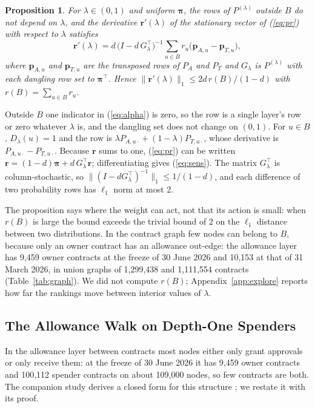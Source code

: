 \documentclass{ieeeaccess}
\newtheorem{proposition}{Proposition}
\begin{document}
\begin{proposition}
\label{prop:localize}
For $\lambda\in(0,1)$ and uniform $\boldsymbol\pi$, the rows of $P^{(\lambda)}$ outside $B$ do not depend on $\lambda$, and the derivative $\mathbf r'(\lambda)$ of the stationary vector of (\ref{eq:pr}) with respect to $\lambda$ satisfies
\begin{equation}
\mathbf r'(\lambda)=d\,\bigl(I-d\,G_\lambda^{\top}\bigr)^{-1}\sum_{u\in B} r_u\bigl(\mathbf p_{A,u}-\mathbf p_{T,u}\bigr),
\label{eq:sens}
\end{equation}
where $\mathbf p_{A,u}$ and $\mathbf p_{T,u}$ are the transposed rows of $P_A$ and $P_T$ and $G_\lambda$ is $P^{(\lambda)}$ with each dangling row set to $\boldsymbol\pi^{\top}$. Hence $\|\mathbf r'(\lambda)\|_1\le 2d\,r(B)/(1-d)$ with $r(B)=\sum_{u\in B}r_u$.
\end{proposition}

\begin{IEEEproof}
Outside $B$ one indicator in (\ref{eq:alpha}) is zero, so the row is a single layer's row or zero whatever $\lambda$ is, and the dangling set does not change on $(0,1)$. For $u\in B$, $D_\lambda(u)=1$ and the row is $\lambda P_{A,u\cdot}+(1-\lambda)P_{T,u\cdot}$, whose derivative is $P_{A,u\cdot}-P_{T,u\cdot}$. Because $\mathbf r$ sums to one, (\ref{eq:pr}) can be written $\mathbf r=(1-d)\boldsymbol\pi+d\,G_\lambda^{\top}\mathbf r$; differentiating gives (\ref{eq:sens}). The matrix $G_\lambda^{\top}$ is column-stochastic, so $\|(I-dG_\lambda^{\top})^{-1}\|_1\le 1/(1-d)$, and each difference of two probability rows has $\ell_1$ norm at most 2.
\end{IEEEproof}

The proposition says where the weight can act, not that its action is small: when $r(B)$ is large the bound exceeds the trivial bound of 2 on the $\ell_1$ distance between two distributions. In the contract graph few nodes can belong to $B$, because only an owner contract has an allowance out-edge: the allowance layer has 9,459 owner contracts at the freeze of 30 June 2026 and 10,153 at that of 31 March 2026, in union graphs of 1,299,438 and 1,111,554 contracts (Table~\ref{tab:graph}). We did not compute $r(B)$; Appendix~\ref{app:explore} reports how far the rankings move between interior values of $\lambda$.

\subsection{The Allowance Walk on Depth-One Spenders}
\label{sec:closed}
In the allowance layer between contracts most nodes either only grant approvals or only receive them: at the freeze of 30 June 2026 it has 9,459 owner contracts and 100,112 spender contracts on about 109,000 nodes, so few contracts are both. The companion study derives a closed form for this structure \cite{kwon2026companion}; we restate it with its proof.
\end{document}

